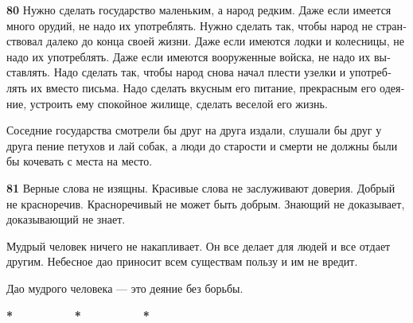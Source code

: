 \documentclass[a4paper]{article}
\begin{document}
{\ttfamily
\foreignlanguage{russian}{\textrm{\textbf{80}}}\foreignlanguage{russian}{\textrm{ Нужно сделать государство маленьким, а
народ редким. Даже если имеется много орудий, не надо их употреблять. Нужно сделать так, чтобы народ не странствовал
далеко до конца своей жизни. Даже если имеются лодки и колесницы, не надо их употреблять. Даже если имеются вооруженные
войска, не надо их выставлять. Надо сделать так, чтобы народ снова начал плести узелки и употреблять их вместо письма.
Надо сделать вкусным его питание, прекрасным его одеяние, устроить ему спокойное жилище, сделать веселой его жизнь.}}}

{
Соседние государства смотрели бы друг на друга издали, слушали бы друг у друга пение петухов и лай собак, а люди до
старости и смерти не должны были бы кочевать с места на место.}

{\ttfamily
\foreignlanguage{russian}{\textrm{\textbf{81}}}\foreignlanguage{russian}{\textrm{ Верные слова не изящны. Красивые слова
не заслуживают доверия. Добрый не красноречив. Красноречивый не может быть добрым. Знающий не доказывает, доказывающий
не знает.}}}

{
Мудрый человек ничего не накапливает. Он все делает для людей и все отдает другим. Небесное дао приносит всем существам
пользу и им не вредит.}

{\ttfamily
\foreignlanguage{russian}{\textrm{Дао мудрого человека — это деяние без борьбы.}}}


\bigskip

{\centering{}\bfseries
* \ \ \ \ \ \ \ \ \ * \ \ \ \ \ \ \ \ \ *
\par}
\end{document}

